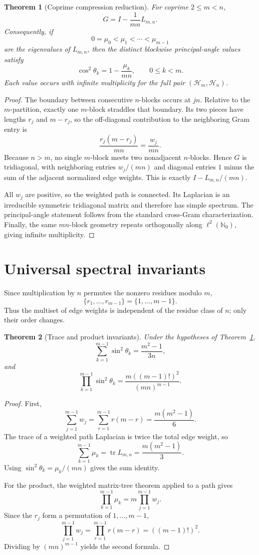 \documentclass[11pt]{article}
\newtheorem{theorem}{Theorem}[section]
\theoremstyle{remark}
\newcommand{\1}{\mathbf 1}
\begin{document}
\begin{theorem}[Coprime compression reduction]\label{thm:compression}
For coprime $2\le m<n$,
\[
G=I-\frac1{mn}L_{m,n}.
\]
Consequently, if
\[
0=\mu_0<\mu_1<\cdots<\mu_{m-1}
\]
are the eigenvalues of $L_{m,n}$, then the distinct blockwise
principal-angle values satisfy
\[
\cos^2\theta_k=1-\frac{\mu_k}{mn},\qquad 0\le k<m.
\]
Each value occurs with infinite multiplicity for the full pair
$(\mathcal H_m,\mathcal H_n)$.
\end{theorem}

\begin{proof}
The boundary between consecutive $n$-blocks occurs at $jn$. Relative to the
$m$-partition, exactly one $m$-block straddles that boundary. Its two pieces
have lengths $r_j$ and $m-r_j$, so the off-diagonal contribution to the
neighboring Gram entry is
\[
\frac{r_j(m-r_j)}{mn}=\frac{w_j}{mn}.
\]
Because $n>m$, no single $m$-block meets two nonadjacent $n$-blocks. Hence
$G$ is tridiagonal, with neighboring entries $w_j/(mn)$ and diagonal entries
$1$ minus the sum of the adjacent normalized edge weights. This is exactly
$I-L_{m,n}/(mn)$.

All $w_j$ are positive, so the weighted path is connected. Its Laplacian is
an irreducible symmetric tridiagonal matrix and therefore has simple
spectrum. The principal-angle statement follows from the standard
cross-Gram characterization. Finally, the same $mn$-block geometry repeats
orthogonally along $\ell^2(\mathbb N_0)$, giving infinite multiplicity.
\end{proof}

\section{Universal spectral invariants}
Since multiplication by $n$ permutes the nonzero residues modulo $m$,
\[
\{r_1,\ldots,r_{m-1}\}=\{1,\ldots,m-1\}.
\]
Thus the multiset of edge weights is independent of the residue class of
$n$; only their order changes.

\begin{theorem}[Trace and product invariants]\label{thm:invariants}
Under the hypotheses of Theorem~\ref{thm:compression},
\[
\sum_{k=1}^{m-1}\sin^2\theta_k=\frac{m^2-1}{3n},
\]
and
\[
\prod_{k=1}^{m-1}\sin^2\theta_k
=\frac{m((m-1)!)^2}{(mn)^{m-1}}.
\]
\end{theorem}

\begin{proof}
First,
\[
\sum_{j=1}^{m-1}w_j
=\sum_{r=1}^{m-1}r(m-r)
=\frac{m(m^2-1)}6.
\]
The trace of a weighted path Laplacian is twice the total edge weight, so
\[
\sum_{k=1}^{m-1}\mu_k=\operatorname{tr}L_{m,n}
=\frac{m(m^2-1)}3.
\]
Using $\sin^2\theta_k=\mu_k/(mn)$ gives the sum identity.

For the product, the weighted matrix-tree theorem applied to a path gives
\[
\prod_{k=1}^{m-1}\mu_k=m\prod_{j=1}^{m-1}w_j.
\]
Since the $r_j$ form a permutation of $1,\ldots,m-1$,
\[
\prod_{j=1}^{m-1}w_j
=\prod_{r=1}^{m-1}r(m-r)=((m-1)!)^2.
\]
Dividing by $(mn)^{m-1}$ yields the second formula.
\end{proof}
\end{document}
